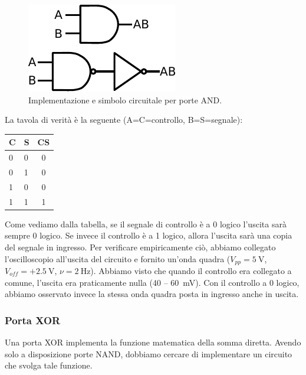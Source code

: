 \begin{figure}
\centering
\includegraphics[width=.22\textwidth]{../E09/latex/AND.pdf}
\caption{Implementazione e simbolo circuitale per porte AND.}
\label{cir9:AND}
\end{figure}

La tavola di verità è la seguente (A=C=controllo, B=S=segnale):

\begin{table}[htpc]
\begin{minipage}{0.6\textwidth}
\centering
{\renewcommand{\arraystretch}{1.1}%
\begin{tabular}{|l|l|c|}
\hline
C & S & CS \\
\hline
0 & 0 & 0\\
\hline
0 & 1 & 0\\
\hline
1 & 0 & 0\\
\hline
1 & 1 & 1\\
\hline
\end{tabular}}
\label{tab9:AND}
\end{minipage}
\end{table}

Come vediamo dalla tabella, se il segnale di controllo è a 0 logico l'uscita sarà sempre 0 logico.
Se invece il controllo è a 1 logico, allora l'uscita sarà una copia del segnale in ingresso.
Per verificare empiricamente ciò, abbiamo collegato l'oscilloscopio all'uscita del circuito e fornito un'onda quadra ($V_{pp}=\SI{5}{\volt}$, $V_{off}=+\SI{2.5}{\volt}$, $\nu=\SI{2}{\hertz}$).
Abbiamo visto che quando il controllo era collegato a comune, l'uscita era praticamente nulla (\num{40} -- \SI{60}{\mV}).
Con il controllo a 0 logico, abbiamo osservato invece la stessa onda quadra posta in ingresso anche in uscita.

\subsubsection{Porta XOR}

Una porta XOR implementa la funzione matematica della somma diretta.
Avendo solo a disposizione porte NAND, dobbiamo cercare di implementare un circuito che svolga tale funzione.

